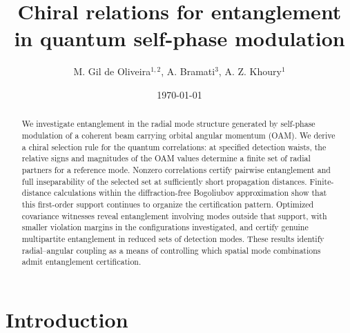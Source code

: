 \documentclass[%
 reprint,
 amsmath,amssymb,
 aps,
pra,
twocolumn,
]{revtex4-2}
\begin{document}
\title{Chiral relations for entanglement in quantum self-phase modulation}

\author{M. Gil de Oliveira$^{1,2}$, A. Bramati$^3$, A. Z. Khoury$^1$}




\date{\today}%

\begin{abstract}
We investigate entanglement in the radial mode structure generated by self-phase modulation of a coherent beam carrying orbital angular momentum (OAM). We derive a chiral selection rule for the quantum correlations: at specified detection waists, the relative signs and magnitudes of the OAM values determine a finite set of radial partners for a reference mode. Nonzero correlations certify pairwise entanglement and full inseparability of the selected set at sufficiently short propagation distances. Finite-distance calculations within the diffraction-free Bogoliubov approximation show that this first-order support continues to organize the certification pattern. Optimized covariance witnesses reveal entanglement involving modes outside that support, with smaller violation margins in the configurations investigated, and certify genuine multipartite entanglement in reduced sets of detection modes. These results identify radial--angular coupling as a means of controlling which spatial mode combinations admit entanglement certification.
\end{abstract}

\maketitle


\section{Introduction}
\label{sec:intro}
\end{document}

